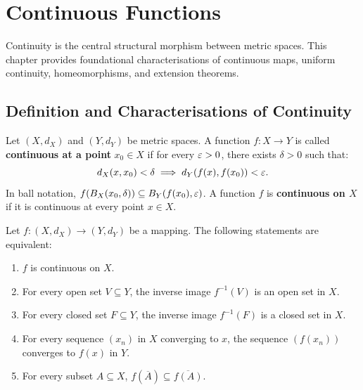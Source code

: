 \chapter{Continuous Functions}
\label{chap:continuous_functions}

Continuity is the central structural morphism between metric spaces. This chapter provides foundational characterisations of continuous maps, uniform continuity, homeomorphisms, and extension theorems.

\section{Definition and Characterisations of Continuity}
\label{sec:continuity_def}

\begin{definition}
Let $(X, d_X)$ and $(Y, d_Y)$ be metric spaces. A function $f: X \to Y$ is called \textbf{continuous at a point} $x_0 \in X$ if for every $\varepsilon > 0$, there exists $\delta > 0$ such that:
\[
d_X(x, x_0) < \delta \implies d_Y(f(x), f(x_0)) < \varepsilon.
\]
In ball notation, $f(B_X(x_0, \delta)) \subseteq B_Y(f(x_0), \varepsilon)$. A function $f$ is \textbf{continuous on $X$} if it is continuous at every point $x \in X$.
\end{definition}

\begin{theorem}
Let $f: (X, d_X) \to (Y, d_Y)$ be a mapping. The following statements are equivalent:
\begin{enumerate}[label=\rm{(\roman*)}]
    \item $f$ is continuous on $X$.
    \item For every open set $V \subseteq Y$, the inverse image $f^{-1}(V)$ is an open set in $X$.
    \item For every closed set $F \subseteq Y$, the inverse image $f^{-1}(F)$ is a closed set in $X$.
    \item For every sequence $(x_n)$ in $X$ converging to $x$, the sequence $(f(x_n))$ converges to $f(x)$ in $Y$.
    \item For every subset $A \subseteq X$, $f(\overline{A}) \subseteq \overline{f(A)}$.
\end{enumerate}
\end{theorem}

